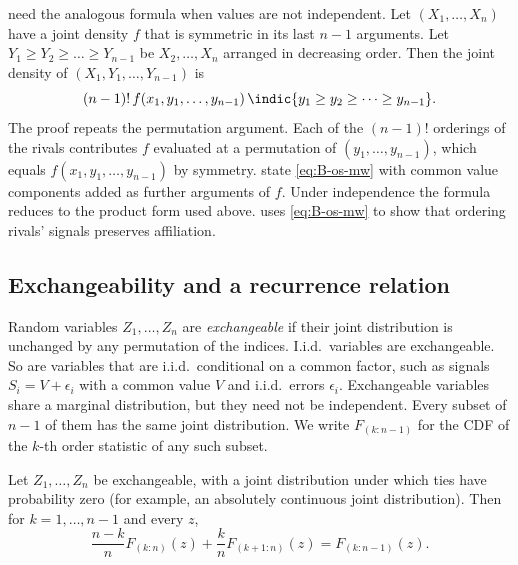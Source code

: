 \citet{MilgromWeber1982} need the analogous formula when values are not independent. Let $(X_1, \dots,
X_n)$ have a joint density $f$ that is symmetric in its last $n-1$ arguments. Let $Y_1 \geq Y_2 \geq \dots
\geq Y_{n-1}$ be $X_2, \dots, X_n$ arranged in decreasing order. Then the joint density of $(X_1, Y_1, \dots,
Y_{n-1})$ is
\begin{equation}\label{eq:B-os-mw}
  (n-1)!\,f(x_1, y_1, \dots, y_{n-1})\,\indic\{y_1 \geq y_2 \geq \dots \geq y_{n-1}\}.
\end{equation}
The proof repeats the permutation argument. Each of the $(n-1)!$ orderings of the rivals contributes $f$
evaluated at a permutation of $(y_1, \dots, y_{n-1})$, which equals $f(x_1, y_1, \dots, y_{n-1})$ by symmetry.
\citet[eq.~(4), p.~1099]{MilgromWeber1982} state \eqref{eq:B-os-mw} with common value components added as
further arguments of $f$. Under independence the formula reduces to the product form used above.
 uses \eqref{eq:B-os-mw} to show that ordering rivals' signals preserves affiliation.

\subsection{Exchangeability and a recurrence relation}\label{sec:B-os-recurrence}

Random variables $Z_1, \dots, Z_n$ are \emph{exchangeable} if their joint distribution is unchanged by any
permutation of the indices. I.i.d.\ variables are exchangeable. So are variables that are i.i.d.\
conditional on a common factor, such as signals $S_i = V + \epsilon_i$ with a common value $V$ and i.i.d.\
errors $\epsilon_i$. Exchangeable variables share a marginal distribution, but they need not be independent.
Every subset of $n-1$ of them has the same joint distribution. We write $F_{(k:n-1)}$ for the CDF of the
$k$-th order statistic of any such subset.

\begin{proposition}\label{prop:B-os-recurrence}
Let $Z_1, \dots, Z_n$ be exchangeable, with a joint distribution under which ties have probability zero (for
example, an absolutely continuous joint distribution). Then for $k = 1, \dots, n-1$
and every $z$,
\begin{equation}\label{eq:B-os-recurrence}
  \frac{n-k}{n}F_{(k:n)}(z) + \frac{k}{n}F_{(k+1:n)}(z) = F_{(k:n-1)}(z).
\end{equation}
\end{proposition}

